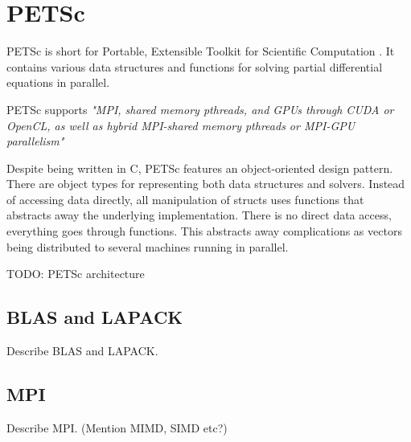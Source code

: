 \section{PETSc}

PETSc is short for Portable, Extensible Toolkit for Scientific Computation 
\cite{petsc-web-page}. It contains various data structures and functions for 
solving partial differential equations in parallel. 

PETSc supports \emph{"MPI, shared memory pthreads, and GPUs through CUDA or OpenCL, as 
well as hybrid MPI-shared memory pthreads or MPI-GPU parallelism"}\cite{petsc-web-page}

Despite being written in C, PETSc features an object-oriented design pattern.
There are object types for representing both data structures and solvers.
Instead of accessing data directly, all manipulation of structs uses functions
that abstracts away the underlying implementation. There is no direct data
access, everything goes through functions. This abstracts away complications as 
vectors being distributed to several machines running in parallel.

TODO: PETSc architecture

\subsection{BLAS and LAPACK}

Describe BLAS and LAPACK.

\subsection{MPI}

Describe MPI. (Mention MIMD, SIMD etc?)

